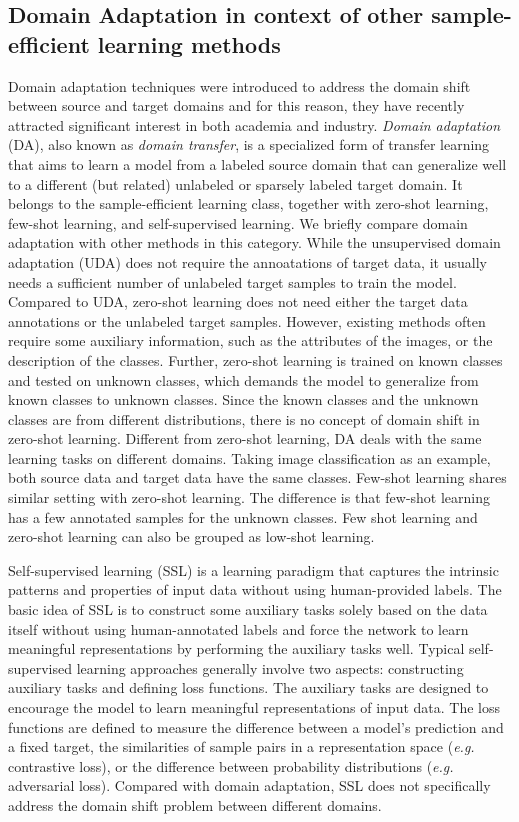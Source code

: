 \documentclass[conference]{IEEEtran}
\begin{document}
\subsection{Domain Adaptation in context of other sample-efficient 
learning methods}
Domain adaptation techniques were introduced to address the domain shift
between source and target domains \cite{b1} and for this reason,
they have recently attracted significant interest in both academia
and industry. 
\textit{Domain adaptation} (DA), also known as \textit{domain transfer},
is a specialized form of transfer learning that aims to learn a
model from a labeled source domain that can generalize well to a 
different (but related) unlabeled or sparsely labeled target domain.
It belongs to the sample-efficient learning class, together with zero-shot
learning, few-shot learning, and self-supervised learning.
We briefly compare domain adaptation with other methods in this category.
While the unsupervised domain adaptation (UDA) does not require the annoatations 
of target  data, it usually needs a sufficient number of unlabeled target  samples 
to train the model.
Compared to UDA, zero-shot learning does not need either the target data 
annotations or the unlabeled target samples. 
However, existing methods often require some auxiliary information, 
such as the attributes of the images, or the description of the classes.
Further, zero-shot learning is trained on known classes and tested on unknown classes,
which demands the model to generalize from known classes to unknown classes.
Since the known classes and the unknown classes are from different distributions,
there is no concept of domain shift in zero-shot learning.
Different from zero-shot learning, DA deals with the same learning tasks on different
domains. 
Taking image classification as an example, both source data and target data 
have the same classes. 
Few-shot learning shares similar setting with zero-shot learning.
The difference is that few-shot learning has a few annotated samples for the unknown classes.
Few shot learning and zero-shot learning can also be grouped as low-shot learning.

Self-supervised learning (SSL) is a learning paradigm that captures
the intrinsic patterns and properties of input data without using human-provided labels.
The basic idea of SSL is to construct some auxiliary tasks solely based on the data itself
without using human-annotated labels and force the network to learn meaningful representations
by performing the auxiliary tasks well.
Typical self-supervised learning approaches generally involve two aspects:
constructing auxiliary tasks and defining loss functions.
The auxiliary tasks are designed to encourage the model to learn meaningful 
representations of input data.
The loss functions are defined to measure the difference between a model's prediction
and a fixed target, the similarities of sample pairs in a representation space (\textit{e.g.} contrastive loss),
or the difference between probability distributions (\textit{e.g.} adversarial loss).
Compared with domain adaptation, SSL does not specifically address the domain shift problem 
between different domains.



\end{document}
